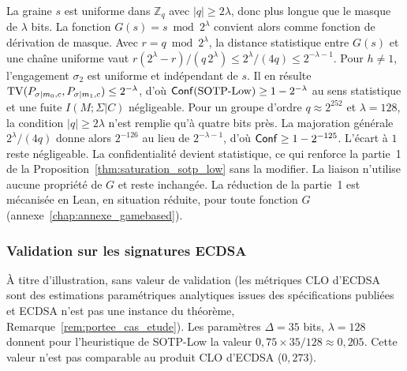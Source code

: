 \begin{sloppypar}
\begin{remark}\label{rem:masque_troncature}
La graine $s$ est uniforme dans $\mathbb{Z}_q$ avec $|q| \geq 2\lambda$, donc plus longue que le
masque de $\lambda$ bits. La fonction $G(s) = s \bmod 2^\lambda$ convient alors comme fonction de
d\'erivation de masque. Avec $r = q \bmod 2^\lambda$, la distance statistique entre $G(s)$ et une
cha\^ine uniforme vaut $r(2^\lambda - r)/(q\,2^\lambda) \leq 2^\lambda/(4q) \leq 2^{-\lambda-1}$. Pour
$h \neq 1$, l'engagement $\sigma_2$ est uniforme et ind\'ependant de $s$. Il en
r\'esulte $\operatorname{TV}(P_{\sigma|m_0,c}, P_{\sigma|m_1,c}) \leq 2^{-\lambda}$, d'o\`u
$\mathsf{Conf}(\mathrm{SOTP\text{-}Low}) \geq 1 - 2^{-\lambda}$ au sens statistique et une fuite
$I(M;\Sigma|C)$ n\'egligeable. Pour un groupe d'ordre $q \approx 2^{252}$ et $\lambda = 128$, la condition $|q| \geq 2\lambda$ n'est remplie qu'\`a quatre bits pr\`es. La
majoration g\'en\'erale $2^\lambda/(4q)$ donne alors $2^{-126}$ au lieu de $2^{-\lambda-1}$, d'o\`u $\mathsf{Conf} \geq 1 - 2^{-125}$. L'\'ecart \`a $1$ reste n\'egligeable. La confidentialit\'e devient statistique, ce qui renforce la partie~1
de la Proposition~\ref{thm:saturation_sotp_low} sans la modifier. La liaison n'utilise aucune
propri\'et\'e de $G$ et reste inchang\'ee. La r\'eduction de la partie~1 est m\'ecanis\'ee en Lean, en
situation r\'eduite, pour toute fonction $G$ (annexe~\ref{chap:annexe_gamebased}).
\end{remark}

\subsubsection{Validation sur les signatures ECDSA}
\label{subsubsec:validation_ecdsa}

\`A titre d'illustration, sans valeur de validation (les m\'etriques CLO d'ECDSA sont
des estimations param\'etriques analytiques issues des sp\'ecifications
publi\'ees~\cite{Johnson01,NIST.FIPS.186-5} et ECDSA n'est pas une instance du
th\'eor\`eme, Remarque~\ref{rem:portee_cas_etude}). Les param\`etres $\Delta = 35$ bits,
$\lambda = 128$ donnent pour l'heuristique de SOTP-Low la valeur
$0{,}75 \times 35/128 \approx 0{,}205$. Cette valeur n'est pas comparable au produit
CLO d'ECDSA ($0{,}273$).
\end{sloppypar}

